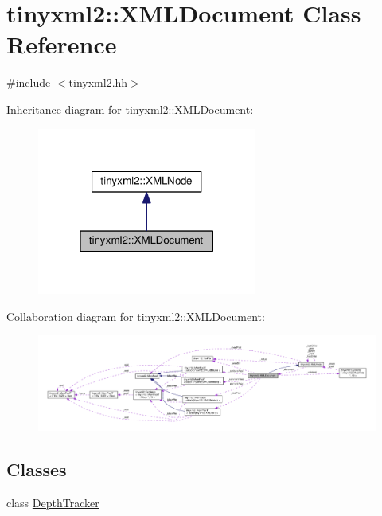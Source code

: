\hypertarget{classtinyxml2_1_1XMLDocument}{}\section{tinyxml2\+:\+:X\+M\+L\+Document Class Reference}
\label{classtinyxml2_1_1XMLDocument}


{\ttfamily \#include $<$tinyxml2.\+hh$>$}



Inheritance diagram for tinyxml2\+:\+:X\+M\+L\+Document\+:
\nopagebreak
\begin{figure}[H]
\begin{center}
\leavevmode
\includegraphics[width=205pt]{classtinyxml2_1_1XMLDocument__inherit__graph}
\end{center}
\end{figure}


Collaboration diagram for tinyxml2\+:\+:X\+M\+L\+Document\+:
\nopagebreak
\begin{figure}[H]
\begin{center}
\leavevmode
\includegraphics[width=350pt]{classtinyxml2_1_1XMLDocument__coll__graph}
\end{center}
\end{figure}
\subsection*{Classes}
\begin{DoxyCompactItemize}
\item 
class \hyperlink{classtinyxml2_1_1XMLDocument_1_1DepthTracker}{Depth\+Tracker}
\end{DoxyCompactItemize}
